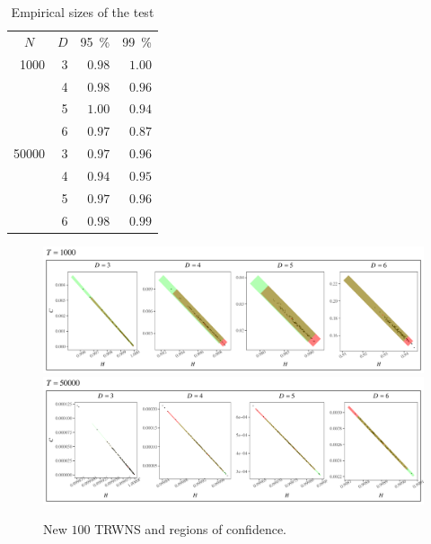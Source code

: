 \begin{table}[hbt]
	\centering
	\caption{Empirical sizes of the test}
	\label{tab:result1}
	\begin{tabular}{*{3}rr}
		\toprule
		\multicolumn{1}{c}{$N$} & \multicolumn{1}{c}{$D$} & \multicolumn{1}{c}{\SI{95}{\percent}} & \multicolumn{1}{c}{\SI{99}{\percent}}\\
		\cmidrule(lr){1-1}
		\cmidrule(lr){2-2}
		\cmidrule(lr){3-3}
		\cmidrule(lr){4-4}
		1000 & 3 & $0.98$ & $1.00$\\
		& 4 & $0.98$ & $0.96$\\
		& 5 & $1.00$ & $0.94$\\
		& 6 & $0.97$ & $0.87$\\
		\cmidrule(lr){1-4} 
		50000 & 3 & $0.97$ & $0.96$\\
		& 4 & $0.94$ & $0.95$\\
		& 5 & $0.97$ & $0.96$\\ 
		& 6 & $0.98$ & $0.99$\\ 
		\bottomrule
	\end{tabular}
\end{table}

\begin{figure}[hbt]
	\centering
	\includegraphics[width=\linewidth]{Figures/RNG-1000.pdf}
	\includegraphics[width=\linewidth]{Figures/RNG-50000.pdf}
	\caption{New $100$ TRWNS and regions of confidence.}
	\label{fig:RNG}
\end{figure}

